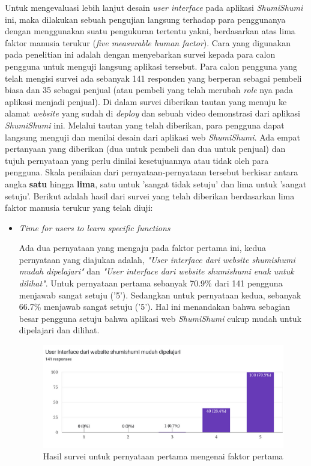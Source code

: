 \documentclass[a4paper]{article}
\begin{document}
\begin{enumerate}
    Untuk mengevaluasi lebih lanjut desain \textit{user interface} pada aplikasi \textit{ShumiShumi} ini, maka dilakukan sebuah pengujian langsung terhadap para penggunanya dengan menggunakan suatu pengukuran tertentu yakni, berdasarkan atas lima faktor manusia terukur (\textit{five measurable human factor}). Cara yang digunakan pada penelitian ini adalah dengan menyebarkan survei kepada para calon pengguna untuk menguji langsung aplikasi tersebut. Para calon pengguna yang telah mengisi survei ada sebanyak 141 responden yang berperan sebagai pembeli biasa dan 35 sebagai penjual (atau pembeli yang telah merubah \textit{role} nya pada aplikasi menjadi penjual). Di dalam survei diberikan tautan yang menuju ke alamat \textit{website} yang sudah di \textit{deploy} dan sebuah video demonstrasi dari aplikasi \textit{ShumiShumi} ini. Melalui tautan yang telah diberikan, para pengguna dapat langsung menguji dan menilai desain dari aplikasi web \textit{ShumiShumi}. Ada empat pertanyaan yang diberikan (dua untuk pembeli dan dua untuk penjual) dan tujuh pernyataan yang perlu dinilai kesetujuannya atau tidak oleh para pengguna. Skala penilaian dari pernyataan-pernyataan tersebut berkisar antara angka \textbf{satu} hingga \textbf{lima}, satu untuk 'sangat tidak setuju' dan lima untuk 'sangat setuju'. Berikut adalah hasil dari survei yang telah diberikan berdasarkan lima faktor manusia terukur yang telah diuji: 

    \begin{itemize}
        \item \textit{Time for users to learn specific functions}
        
        Ada dua pernyataan yang mengaju pada faktor pertama ini, kedua pernyataan yang diajukan adalah, \textit{"User interface dari website shumishumi mudah dipelajari"} dan \textit{"User interface dari website shumishumi enak untuk dilihat"}. Untuk pernyataan pertama sebanyak 70.9\% dari 141 pengguna menjawab sangat setuju ('5'). Sedangkan untuk pernyataan kedua, sebanyak 66.7\% menjawab sangat setuju ('5'). Hal ini menandakan bahwa sebagian besar pengguna setuju bahwa aplikasi web \textit{ShumiShumi} cukup mudah untuk dipelajari dan dilihat.

        \newpage
        \begin{figure}[h]
            \centering
            \includegraphics[scale=0.50]{images/evaluasi ui user 2/Survei 2 - Pertanyaan 4.png}
            \caption{Hasil survei untuk pernyataan pertama mengenai faktor pertama}
        \end{figure}


\end{itemize}
\end{enumerate}
\end{document}
